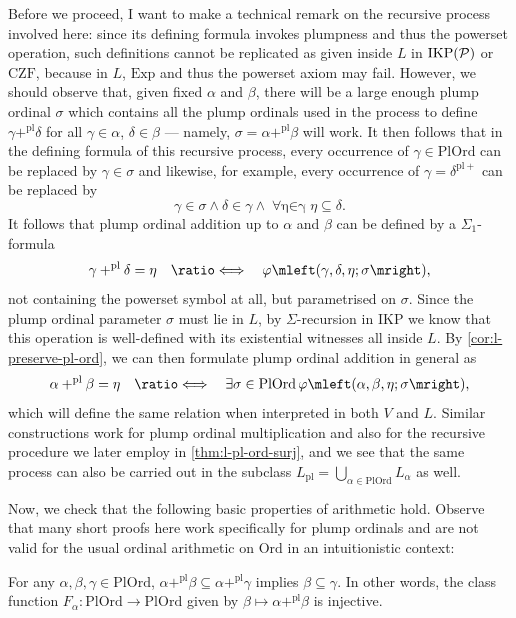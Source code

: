 \documentclass[12pt,openany]{book}
\theoremstyle{plain}
\theoremstyle{definition}
\newcommand\opA[1]{\mathop{\forall #1}}
\newcommand\opE[1]{\mathop{\exists #1}}
\newcommand\defeqv{\quad \ratio\Longleftrightarrow \quad}
\newcommand\Pow{\mathcal{P}}
\newcommand\CZF{\mathrm{CZF}}
\newcommand\Exp{\mathrm{Exp}}
\newcommand\IKP{\mathrm{IKP}}
\newcommand\IKPP{\mathrm{IKP}\mleft(\Pow\mright)}
\newcommand\Ord{\mathrm{Ord}}
\newcommand\PlOrd{\mathrm{PlOrd}}
\newcommand\pl{\mathrm{pl}}
\newcommand\pls{{\pl +}}
\begin{document}
\label{loc:l-pl-rec-impl-remark}
Before we proceed, I want to make a technical remark on the recursive process involved here: since its defining formula invokes plumpness and thus the powerset operation, such definitions cannot be replicated as given inside $L$ in $\IKPP$ or $\CZF$, because in $L$, $\Exp$ and thus the powerset axiom may fail. However, we should observe that, given fixed $\alpha$ and $\beta$, there will be a large enough plump ordinal $\sigma$ which contains all the plump ordinals used in the process to define $\gamma +^\pl \delta$ for all $\gamma \in \alpha$, $\delta \in \beta$ --- namely, $\sigma = \alpha +^\pl \beta$ will work. It then follows that in the defining formula of this recursive process, every occurrence of $\gamma \in \PlOrd$ can be replaced by $\gamma \in \sigma$ and likewise, for example, every occurrence of $\gamma = \delta^\pls$ can be replaced by
\[\gamma \in \sigma \land \delta \in \gamma \land \opA{\eta \in \gamma} \eta \subseteq \delta.\]
It follows that plump ordinal addition up to $\alpha$ and $\beta$ can be defined by a $\Sigma_1$-formula
\[\gamma +^\pl \delta = \eta \defeqv \varphi\mleft(\gamma, \delta, \eta; \sigma\mright),\]
not containing the powerset symbol at all, but parametrised on $\sigma$. Since the plump ordinal parameter $\sigma$ must lie in $L$, by $\Sigma$-recursion in $\IKP$ we know that this operation is well-defined with its existential witnesses all inside $L$. By \autoref{cor:l-preserve-pl-ord}, we can then formulate plump ordinal addition in general as
\[\alpha +^\pl \beta = \eta \defeqv \opE{\sigma \in \PlOrd} \varphi\mleft(\alpha, \beta, \eta; \sigma\mright),\]
which will define the same relation when interpreted in both $V$ and $L$. Similar constructions work for plump ordinal multiplication and also for the recursive procedure we later employ in \autoref{thm:l-pl-ord-surj}, and we see that the same process can also be carried out in the subclass $L_\pl = \bigcup_{\alpha \in \PlOrd} L_\alpha$ as well.

Now, we check that the following basic properties of arithmetic hold. Observe that many short proofs here work specifically for plump ordinals and are not valid for the usual ordinal arithmetic on $\Ord$ in an intuitionistic context:
\begin{lemma}
  \label{lem:pl-add-inj}
  For any $\alpha, \beta, \gamma \in \PlOrd$, $\alpha +^\pl \beta \subseteq \alpha +^\pl \gamma$ implies $\beta \subseteq \gamma$. In other words, the class function $F_\alpha : \PlOrd \rightarrow \PlOrd$ given by $\beta \mapsto \alpha +^\pl \beta$ is injective.
\end{lemma}
\end{document}
